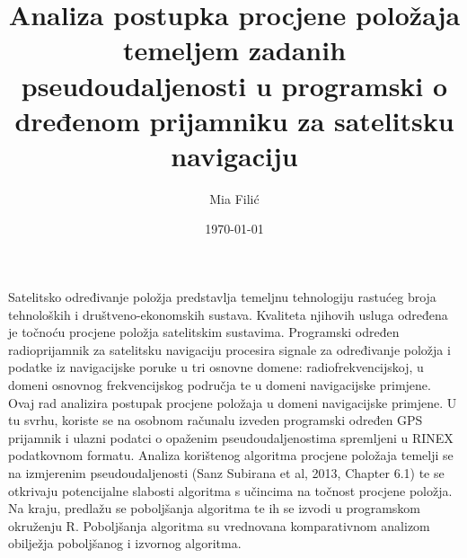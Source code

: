 \documentclass[a4paper,twoside,12pt]{memoir} %
\title{Analiza postupka procjene položaja temeljem
	zadanih pseudoudaljenosti u programski o dređenom
	prijamniku za satelitsku navigaciju}
\author{Mia Filić}
\date{\today}  %
\begin{document}
\frontmatter


\begin{intro}
Satelitsko određivanje položja predstavlja temeljnu
tehnologiju rastućeg broja tehnoloških i društveno-ekonomskih sustava.
Kvaliteta njihovih
usluga određena je točnoću procjene položja
satelitskim sustavima.
Programski određen radioprijamnik za satelitsku navigaciju
procesira signale za određivanje položja i podatke
iz navigacijske poruke
u tri osnovne domene: radiofrekvencijskoj, u domeni osnovnog frekvencijskog
područja te u domeni navigacijske primjene.
Ovaj rad analizira postupak procjene položaja
u domeni navigacijske primjene. U tu svrhu, koriste se na osobnom računalu
izveden programski određen GPS prijamnik i ulazni podatci
o opaženim pseudoudaljenostima spremljeni
u RINEX podatkovnom formatu.
Analiza korištenog algoritma procjene položaja
temelji se na izmjerenim pseudoudaljenosti (Sanz Subirana et al, 2013, Chapter 6.1)
te se otkrivaju potencijalne slabosti algoritma
s učincima na točnost procjene položja. Na kraju, predlažu se poboljšanja
algoritma te ih se izvodi u programskom okruženju R. 
Poboljšanja algoritma su vrednovana komparativnom analizom obilježja
poboljšanog i izvornog algoritma.
\end{intro}


\end{document}
